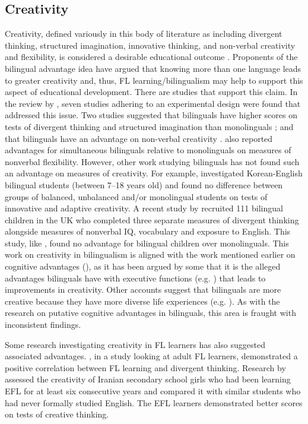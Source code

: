 \documentclass[output=paper]{langscibook}
\begin{document}
\subsection{Creativity}

Creativity, defined variously in this body of literature as including divergent thinking, structured imagination, innovative thinking, and non-verbal creativity and flexibility, is considered a desirable educational outcome \citep{Harris2016}. Proponents of the bilingual advantage idea have argued that knowing more than one language leads to greater creativity and, thus, FL learning/bilingualism may help to support this aspect of educational development. There are studies that support this claim. In the review by \citet{FoxEtAl2019}, seven studies adhering to an experimental design were found that addressed this issue. Two studies \citep{Kharkhurin2009,Kharkhurin2010} suggested that bilinguals have higher scores on tests of divergent thinking and structured imagination than monolinguals \citep{Kharkhurin2009}; and that bilinguals have an advantage on non-verbal creativity \citep{Kharkhurin2010}. \citet{KostandyanLedovaya2013} also reported advantages for simultaneous bilinguals relative to monolinguals on measures of nonverbal flexibility. However, other work studying bilinguals has not found such an advantage on measures of creativity. For example, \citet{LeeKim2010} investigated Korean-English bilingual students (between 7--18 years old) and found no difference between groups of balanced, unbalanced and/or monolingual students on tests of innovative and adaptive creativity. A recent study by \citet{BootonEtAlInpress} recruited 111 bilingual children in the UK who completed three separate measures of divergent thinking alongside measures of nonverbal IQ, vocabulary and exposure to English. This study, like , found no advantage for bilingual children over monolinguals. This work on creativity in bilingualism is aligned with the work mentioned earlier on cognitive advantages (), as it has been argued by some that it is the alleged advantages bilinguals have with executive functions (e.g. \citealt{SampedroPeña2019}) that leads to improvements in creativity. Other accounts suggest that bilinguals are more creative because they have more diverse life experiences (e.g. \citealt{RitterEtAl2012}). As with the research on putative cognitive advantages in bilinguals, this area is fraught with inconsistent findings.

Some research investigating creativity in FL learners has also suggested associated advantages. \citet{FurstGrin2018}, in a study looking at adult FL learners, demonstrated a positive correlation between FL learning and divergent thinking. Research by \citet{GhonsoolyShowqi2012} assessed the creativity of Iranian secondary school girls who had been learning EFL for at least six consecutive years and compared it with similar students who had never formally studied English. The EFL learners demonstrated better scores on tests of creative thinking. 
\end{document}
